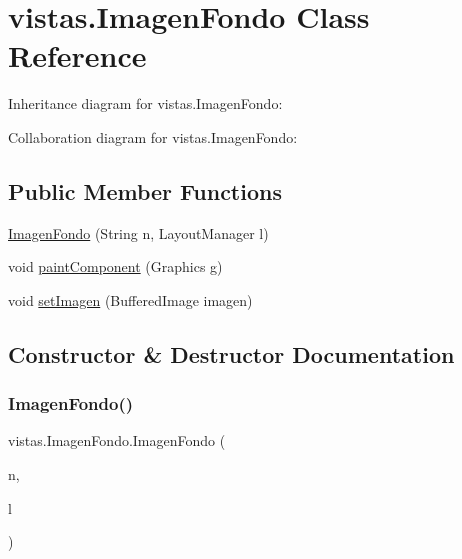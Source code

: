 \hypertarget{classvistas_1_1_imagen_fondo}{}\section{vistas.\+Imagen\+Fondo Class Reference}
\label{classvistas_1_1_imagen_fondo}


Inheritance diagram for vistas.\+Imagen\+Fondo\+:


Collaboration diagram for vistas.\+Imagen\+Fondo\+:
\subsection*{Public Member Functions}
\begin{DoxyCompactItemize}
\item 
\mbox{\hyperlink{classvistas_1_1_imagen_fondo_aece725ff4c487d251cc412842f22d70b}{Imagen\+Fondo}} (String n, Layout\+Manager l)
\item 
void \mbox{\hyperlink{classvistas_1_1_imagen_fondo_a6429d71100efc5595b1c4c5523126721}{paint\+Component}} (Graphics g)
\item 
void \mbox{\hyperlink{classvistas_1_1_imagen_fondo_a005d3ae967e1ff7f995d6d50d7c1d17f}{set\+Imagen}} (Buffered\+Image imagen)
\end{DoxyCompactItemize}


\subsection{Constructor \& Destructor Documentation}
\mbox{\label{classvistas_1_1_imagen_fondo_aece725ff4c487d251cc412842f22d70b}} 
\subsubsection{\texorpdfstring{Imagen\+Fondo()}{ImagenFondo()}}
{\footnotesize\ttfamily vistas.\+Imagen\+Fondo.\+Imagen\+Fondo (\begin{DoxyParamCaption}\item[{String}]{n,  }\item[{Layout\+Manager}]{l }\end{DoxyParamCaption})\hspace{0.3cm}{\ttfamily [inline]}}

